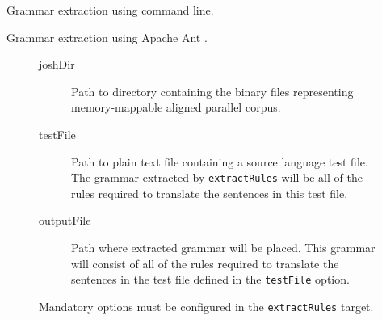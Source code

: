 \documentclass{pbml}
\begin{document}
Grammar extraction using command line.

Grammar extraction using Apache Ant \cite{ant1.7.1}.



\begin{figure}
\begin{description}

	\item[joshDir] Path to directory containing the binary files representing memory-mappable aligned parallel corpus.

	\item[testFile] Path to plain text file containing a source language test file. The grammar extracted by {\tt extractRules} will be all of the rules required to translate the sentences in this test file.

	\item[outputFile] Path where extracted grammar will be placed. This grammar will consist of all of the rules required to translate the sentences in the test file defined in the {\tt testFile} option.
\end{description}
\caption{Mandatory options must be configured in the {\tt extractRules} target.}
\end{figure}
\end{document}

